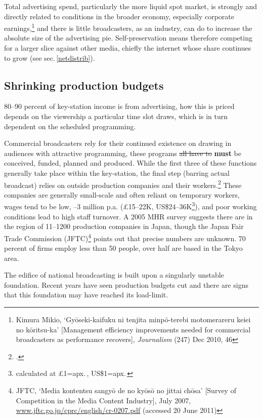 \documentclass[11pt, oneside, a4paper, headsepline]{scrartcl}
\newcommand{\ty}{\textyen}
\begin{document}
Total advertising spend, particularly the more liquid spot market, is strongly and directly related to conditions in the broader economy, especially corporate earnings,\footnote{Kimura Mikio, `Gy\={o}seki-kaifuku ni tenjita minp\={o}-terebi motomerareru keiei no k\={o}ritsu-ka' [Management efficiency improvements needed for commercial broadcasters as performance recovers], \emph{Journalism} (247) Dec 2010, 46\label{note:kaifuku}} and there is little broadcasters, as an industry, can do to increase the absolute size of the advertising pie. Self-preservation means therefore competing for a larger slice against other media, chiefly the internet whose share continues to grow (see sec.\,\ref{netdistrib}).

\subsection{Shrinking production budgets}
\label{program-makers}
80--90 percent of key-station income is from advertising, how this is priced depends on the viewership a particular time slot draws, which is in turn dependent on the scheduled programming. 

Commercial broadcasters rely for their continued existence on drawing in audiences with attractive programming, these programs \st{all have to} \textbf{must} be conceived, funded, planned and produced. While the first three of these functions generally take place within the key-station, the final step (barring actual broadcast) relies on outside production companies and their workers.\footcite{Tanami:2006}  These companies are generally small-scale and often reliant on temporary workers, wages tend to be low, \ty2--3 million p.a. (\pounds 15--22K, US\$24--36K\footnote{calculated at \pounds1=apx.\,\ty130, US\$1=apx.\,\ty80}), and poor working conditions lead to high staff turnover. A 2005 MHR survey suggests there are in the region of 11--1200 production companies in Japan, though the Japan Fair Trade Commission (JFTC)\footnote{JFTC, `Media kontentsu sangy\={o} de no ky\={o}s\={o} no jittai ch\={o}sa' [Survey of Competition in the Media Content Industry], July 2007, \url{www.jftc.go.jp/cprc/english/cr-0207.pdf}  (accessed 20 June 2011)\label{note:jftc}} points out that precise numbers are unknown. 70 percent of firms employ less than 50 people, over half are based in the Tokyo area. 

The edifice of national broadcasting is built upon a singularly unstable foundation. Recent years have seen production budgets cut and there are signs that this foundation may have reached its load-limit.
\end{document}
